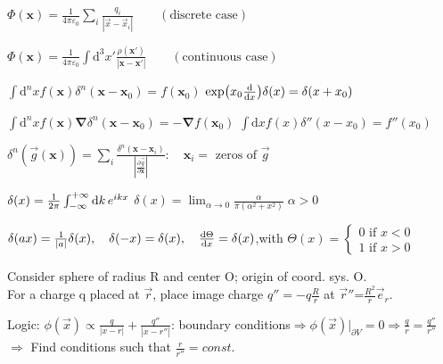 \item $\Phi(\boldsymbol{x}) = \frac{1}{4\pi \varepsilon_0} \sum_{i} \frac{q_i}{|\vec{x}-\vec{x}_i|} \qquad (\text{discrete case})$

\item $\Phi(\boldsymbol{x}) = \frac{1}{4\pi \varepsilon_0} \int \text{d}^3x' \frac{\rho(\boldsymbol{x}')}{|\boldsymbol{x}-\boldsymbol{x}'|} \qquad (\text{continuous case})$
\squishend

\squishlist
\item $\int \text{d}^nx f(\boldsymbol{x})\delta^n(\boldsymbol{x}-\boldsymbol{x}_0)= f(\boldsymbol{x}_0)$ \squishsep $\exp(x_0 \frac{\textrm{d} }{\textrm{d} x})\delta(x) = \delta(x+x_0)$

\item $\int \text{d}^nx f(\boldsymbol{x})\boldsymbol{\nabla}\delta^n(\boldsymbol{x}-\boldsymbol{x}_0)= - \boldsymbol{\nabla}f(\boldsymbol{x}_0)$ \squishsep $\int \text{d}x f(x)\delta''(x-x_0)= f''(x_0)$

\item $\delta^n(\vec{g}(\boldsymbol{x})) = \sum_i \frac{\delta^n(\boldsymbol{x}-\boldsymbol{x}_i)}{\left|\frac{\partial \vec{g}}{\partial \boldsymbol{x}} \right|} : \quad \boldsymbol{x}_i = \text{ zeros of }\vec{g}$

\item $\delta(x) = \frac{1}{2\pi} \int_{-\infty}^{+\infty}\textrm{d} k \, e^{ikx}$ \squishsep $\delta(x) = \lim_{\alpha\rightarrow0}\frac{\alpha}{\pi(\alpha^2 + x^2)}\; \alpha>0$

\item $\delta(ax) = \frac{1}{|a|} \delta(x), \quad \delta(-x) = \delta(x), \quad \frac{\textrm{d} \Theta}{\textrm{d} x} = \delta(x)$,\quad with $\Theta(x)=\begin{cases}0 \text{ if } x<0\\1 \text{ if } x>0\end{cases}$
\squishend


\squishlist
\item Consider sphere of radius R and center O; origin of coord. sys. O.\\
For a charge q placed at $\vec{r}$, place image charge $q''=-q\frac{R}{r}$ at $\vec{r}''$=$\frac{R^2}{r}\vec{e}_r$.
\item Logic: 
$\phi(\vec{x})\propto\frac{q}{|x-r|}+\frac{q''}{|x-r''|}$: boundary conditions$\Rightarrow\phi(\vec{x})|_{\partial V}=0\Rightarrow\frac{q}{r}=\frac{q''}{r''}$\\
$\Rightarrow$ Find conditions such that $\frac{r}{r''}=const$.\\
\squishend
\vspace{5cm}

